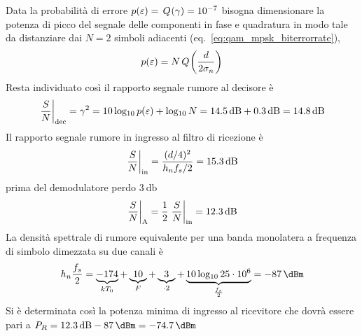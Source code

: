 Data la probabilità di errore $p(\varepsilon)=\,{Q}^{}\!\left({\gamma}\right)=\num{e-7}$ bisogna dimensionare la potenza di picco del segnale delle componenti in fase e quadratura in modo tale da distanziare dai $N=2$ simboli adiacenti (eq.~\ref{eq:qam_mpsk_biterrorrate}),
\[p(\varepsilon)=N\,{Q}^{}\!\left({\frac{d}{2\sigma_n}}\right)\]
Resta individuato così il rapporto segnale rumore al decisore è \[\restrict{\frac{S}{N}}{\text{dec}}=\gamma^2=10\Log{p(\epsilon)}+\Log N=\SI{14.5}{\decibel}+\SI{0.3}{\decibel}=\SI{14.8}{\decibel}\]
Il rapporto segnale rumore in ingresso al filtro di ricezione è
\[\restrict{\frac{S}{N}}{\text{in}}=\frac{(d/4)^2}{h_n f_s/2}=\SI{15.3}{\decibel}\]
prima del demodulatore perdo $\SI{3}{\decibel}$
\[\restrict{\frac{S}{N}}{\text{A}}=\frac{1}{2}\restrict{\frac{S}{N}}{\text{in}}=\SI{12.3}{\decibel}\]
La densità spettrale di rumore equivalente per una banda monolatera a frequenza di simbolo dimezzata su due canali è
\[h_n \frac{f_s}{2}=\underbrace{-174}_{k T_0}+\underbrace{10}_{F}+\underbrace{3}_{\cdot 2}+\underbrace{10\Log{25\cdot 10^6}}_{\frac{f_s}{2}}=\SI{-87}{\dBm}\]
Si è determinata così la potenza minima di ingresso al ricevitore che dovrà essere pari a $P_R=\SI{12.3}{\dB}-\SI{87}{\dBm}=\SI{-74.7}{\dBm}$